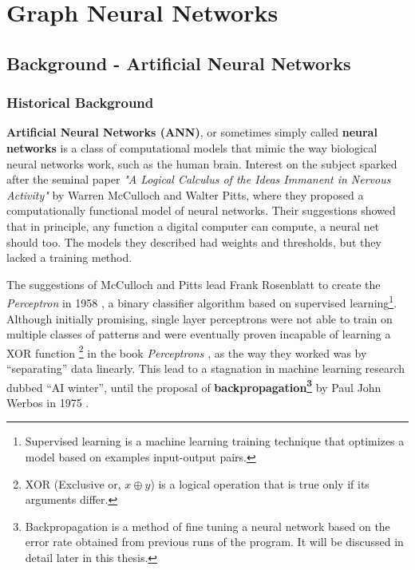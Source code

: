 \chapter{Graph Neural Networks} \label{literature}

\section{Background - Artificial Neural Networks}


\subsection{Historical Background}

\textbf{Artificial Neural Networks (ANN)}, or sometimes simply called
\textbf{neural networks} is a class of computational models that mimic
the way biological neural networks work, such as the human brain. Interest
on the subject sparked after the seminal paper \textit{"A Logical
Calculus of the Ideas Immanent in Nervous Activity"}
\cite{article:McCulloch1943} by Warren McCulloch and Walter Pitts, where
they proposed a computationally functional model of neural networks.
Their suggestions showed that in principle, any function a digital computer
can compute, a neural net should too. The models they described had weights
and thresholds, but they lacked a training method. 

The suggestions of McCulloch and Pitts lead Frank Rosenblatt to create
the \textit{Perceptron} in 1958 \cite{article:Rosenblatt1958ThePA}, a
binary classifier algorithm based on supervised
learning\footnote{Supervised learning is a machine learning training
technique that optimizes a model based on examples input-output
pairs.}. Although initially promising, single layer perceptrons were
not able to train on multiple classes of patterns and were eventually
proven incapable of learning a XOR function \footnote{XOR (Exclusive
or, $x\oplus y$) is a logical operation that is true only if its
arguments differ.} in the book \textit{Perceptrons}
\cite{book:minsky1969perceptrons}, as the way they worked was by
``separating'' data linearly. This lead to a stagnation in machine
learning research dubbed ``AI winter'', until the proposal of
\textbf{backpropagation\footnote{Backpropagation is a method of fine
tuning a neural network based on the error rate obtained from previous
runs of the program. It will be discussed in detail later in this
thesis.}} by Paul John Werbos in 1975 \cite{book:werbos1975beyond}.

